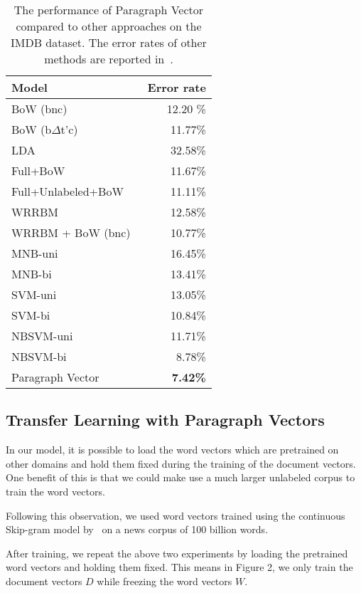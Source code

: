 \documentclass{article}
\begin{document}
\begin{table}[htb]
\caption{The performance of Paragraph Vector compared to other approaches on
  the IMDB dataset. The error rates of other methods are reported
  in~\cite{wang12}.}
\label{tab:imdb}
\begin{center}
\begin{tabular}{|l|r|} 
\hline
Model & Error rate \\ \hline
BoW (bnc)~\cite{maas11} & 12.20 \% \\ 
BoW (b$\Delta$t'c)~\cite{maas11} & 11.77\% \\ 
LDA~\cite{maas11} & 32.58\% \\ 
Full+BoW~\cite{maas11}& 11.67\%\\
Full+Unlabeled+BoW~\cite{maas11}& 11.11\% \\\hline 
WRRBM~\cite{dahl12}& 12.58\%\\
WRRBM + BoW (bnc)~\cite{dahl12}& 10.77\%\\\hline
MNB-uni~\cite{wang12} & 16.45\% \\ 
MNB-bi~\cite{wang12} & 13.41\%\\
SVM-uni~\cite{wang12} & 13.05\%\\
SVM-bi~\cite{wang12} & 10.84\%\\
NBSVM-uni~\cite{wang12} & 11.71\%\\
NBSVM-bi~\cite{wang12} & 8.78\%\\ \hline
Paragraph Vector & {\bf 7.42\%} \\
\hline
\end {tabular}
\end {center}
\end {table}

\iffalse
\subsection{Transfer Learning with Paragraph Vectors}
In our model, it is possible to load the word vectors which are
pretrained on other domains and hold them fixed during the training of
the document vectors. One benefit of this is that we could make use a
much larger unlabeled corpus to train the word vectors.

Following this observation, we used word vectors trained using the
continuous Skip-gram model by~\cite{mikolov} on a news corpus of 100  billion words.

After training, we repeat the above two experiments by loading the
pretrained word vectors and holding them fixed. This means in Figure
2, we only train the document vectors $D$ while freezing the word
vectors $W$.
\end{document}
